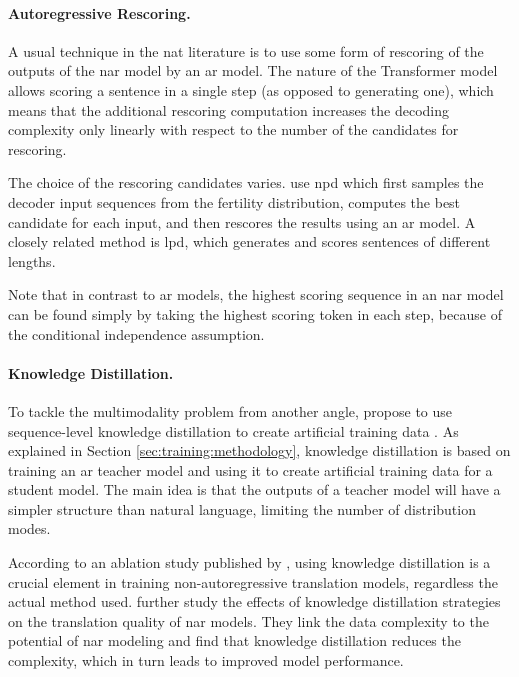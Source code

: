 \paragraph{Autoregressive Rescoring.} A usual technique in the \ac{nat}
literature is to use some form of rescoring of the outputs of the \acl{nar}
model by an \acl{ar} model. The nature of the Transformer model allows scoring
a sentence in a single step (as opposed to generating one), which means that
the additional rescoring computation increases the decoding complexity only
linearly with respect to the number of the candidates for rescoring.

The choice of the rescoring candidates varies. \citet{gu2017nonautoregressive}
use \ac{npd} which first samples the decoder input sequences from the fertility
distribution, computes the best candidate for each input, and then rescores the
results using an \ac{ar} model. A closely related method is \ac{lpd}, which
generates and scores sentences of different lengths.

Note that in contrast to \ac{ar} models, the highest scoring sequence in an
\acs{nar} model can be found simply by taking the highest scoring token in each
step, because of the conditional independence assumption.

\paragraph{Knowledge Distillation.} To tackle the multimodality problem from
another angle, \citet{gu2017nonautoregressive} propose to use sequence-level
knowledge distillation to create artificial training data
\citep{kim-rush-2016-sequence}. As explained in Section
\ref{sec:training:methodology}, knowledge distillation is based on training an
\ac{ar} teacher model and using it to create artificial training data for a
student model. The main idea is that the outputs of a teacher model will have a
simpler structure than natural language, limiting the number of distribution
modes.

According to an ablation study published by \citet{gu-kong-2021-fully}, using
knowledge distillation is a crucial element in training non-autoregressive
translation models, regardless the actual method used.
\citet{zhou-etal-2020-understanding} further study the effects of knowledge
distillation strategies on the translation quality of \ac{nar} models. They
link the data complexity to the potential of \ac{nar} modeling and find that
knowledge distillation reduces the complexity, which in turn leads to improved
model performance.

